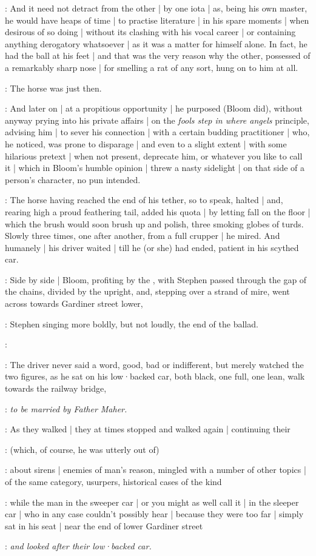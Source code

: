 :
And it need not detract from the other |
by one iota |
as,
being his own master,
he would have heaps of time |
to practise literature |
in his spare moments |
when desirous of so doing |
without its clashing with his vocal career |
or containing anything derogatory whatsoever |
as it was a matter for himself alone.
In fact,
he had the ball at his feet |
and that was the very reason why the other,
possessed of a remarkably sharp nose |
for smelling a rat of any sort,
hung on to him at all.

:
The horse was just then.

:
And later on |
at a propitious opportunity |
he purposed (Bloom did),
without anyway prying into his private affairs |
on the \emph{fools step in where angels} principle,
advising him |
to sever his connection |
with a certain budding practitioner |
who,
he noticed,
was prone to disparage |
and even to a slight extent |
with some hilarious pretext |
when not present,
deprecate him,
or whatever you like to call it |
which in Bloom's humble opinion |
threw a nasty sidelight |
on that side of a person's character,
no pun intended.

:
The horse having reached the end of his tether,
so to speak,
halted |
and,
rearing high a proud feathering tail,
added his quota |
by letting fall on the floor |
which the brush would soon brush up and polish,
three smoking globes of turds.
Slowly three times,
one after another,
from a full crupper |
he mired.
And humanely |
his driver waited |
till he (or she) had ended,
patient in his scythed car.

:
Side by side |
Bloom,
profiting by the ,
with Stephen passed through the gap of the chains,
divided by the upright,
and,
stepping over a strand of mire,
went across towards Gardiner street lower,

:
Stephen singing more boldly,
but not loudly,
the end of the ballad.

\Stephen:
\begin{verse}
\end{verse}

:
The driver never said a word,
good, bad or indifferent,
but merely watched the two figures,
as he sat on his low·backed car,
both black,
one full,
one lean,
walk towards the railway bridge,

:
\emph{to be married by Father Maher.}

:
As they walked |
they at times stopped and walked again |
continuing their 

:
(which,
of course,
he was utterly out of)

:
about sirens |
enemies of man's reason,
mingled with a number of other topics |
of the same category,
usurpers,
historical cases of the kind

:
while the man in the sweeper car |
or you might as well call it |
in the sleeper car |
who in any case couldn't possibly hear |
because they were too far |
simply sat in his seat |
near the end of lower Gardiner street

:
\emph{and looked after their low·backed car.}


